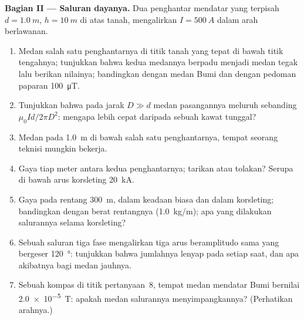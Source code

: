 \begin{problem}
\medskip
\noindent\textbf{Bagian II --- Saluran dayanya.}
Dua penghantar mendatar yang terpisah $d = \qty{1.0}{m}$, $h = \qty{10}{m}$ di atas
tanah, mengalirkan $I = \qty{500}{A}$ dalam arah berlawanan.
\begin{enumerate}[resume]
  \item Medan salah satu penghantarnya di titik tanah yang tepat di bawah
        titik tengahnya; tunjukkan bahwa kedua medannya berpadu menjadi medan tegak
        lalu berikan nilainya; bandingkan dengan medan Bumi dan dengan
        pedoman paparan \qty{100}{\micro T}.
  \item Tunjukkan bahwa pada jarak $D \gg d$ medan pasangannya meluruh sebanding
        $\mu_0Id/2\pi D^2$: mengapa lebih cepat daripada sebuah kawat tunggal?
  \item Medan pada \qty{1.0}{m} di bawah salah satu penghantarnya, tempat seorang teknisi
        mungkin bekerja.
  \item Gaya tiap meter antara kedua penghantarnya; tarikan atau
        tolakan? Serupa di bawah arus korsleting \qty{20}{kA}.
  \item Gaya pada rentang \qty{300}{m}, dalam keadaan biasa dan dalam korsleting;
        bandingkan dengan berat rentangnya (\qty{1.0}{kg/m}); apa yang dilakukan salurannya
        selama korsleting?
  \item Sebuah saluran tiga fase mengalirkan tiga arus beramplitudo sama
        yang bergeser \qty{120}{\degree}: tunjukkan bahwa jumlahnya lenyap pada
        setiap saat, dan apa akibatnya bagi medan jauhnya.
  \item Sebuah kompas di titik pertanyaan~8, tempat medan mendatar
        Bumi bernilai \qty{2.0e-5}{T}: apakah medan salurannya
        menyimpangkannya? (Perhatikan arahnya.)
\end{enumerate}


\end{problem}
